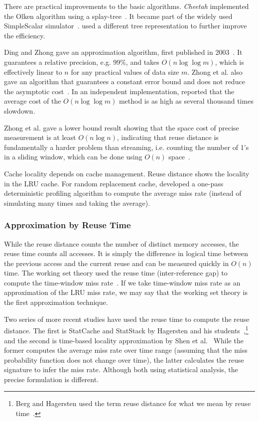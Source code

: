 There are practical improvements to the basic algorithms.  {\em Cheetah}
implemented the Olken algorithm using a
splay-tree~\citep{Sugumar:Dissertation}.  It became part of the
widely used SimpleScalar simulator~\citep{BurgerA:TR97}.
\citet{Almasi+:MSP02} used a different tree representation to further
improve the efficiency.
 
Ding and Zhong gave an approximation algorithm, first published in
2003~\citep{DingZ:PLDI03,Zhong+:TOPLAS09}.  It guarantees a relative
precision, e.g. 99\%, and takes $O( n \log \log m)$, which is
effectively linear to $n$ for any practical values of data size $m$.
Zhong et al. also gave an algorithm that guarantees a constant error
bound and does not reduce the asymptotic cost~\citep{Zhong+:LCR02}.
In an independent implementation, \citet{Schuff+:PACT10} reported that the average cost of the
$O(n \log \log m)$ method is as high as
several thousand times slowdown.

Zhong et al. gave a lower bound result showing that the space
cost of precise measurement is at least $O(n \log n)$, indicating that
reuse distance is fundamentally a harder problem than streaming, i.e. 
counting the number of 1's in a sliding window, which can be done
using $O(n)$ space~\citep{Zhong+:TOPLAS09}.  

Cache locality depends on cache management.  Reuse distance shows the
locality in the LRU cache.  For random
replacement cache, \citet{Zhou:NPC10} developed a one-pass
deterministic profiling algorithm to compute the average miss rate
(instead of simulating many times and taking the average).


\subsubsection{Approximation by Reuse Time}
While the reuse distance counts the number of distinct memory
accesses, the reuse time counts all accesses.  It is simply the difference in logical
time between the previous access and the current reuse and can be measured
quickly in $O(n)$ time.  The 
working set theory used the reuse time (inter-reference gap) to compute the time-window miss
rate~\citep{DenningS:CACM72}.  If we take time-window miss rate as an approximation of the LRU miss
rate, we may say that the working set theory is the first
approximation technique.  

Two series of more recent studies have used the reuse time
to compute the reuse distance.  The first is StatCache and StatStack
by Hagersten and his
students~\citep{BergH:ISPASS04,BergH:SIGMETRICS05,EklovH:ISPASS10,Eklov+:HiPEAC11},\footnote{Berg and
  Hagersten used the term reuse distance for what we mean by reuse
  time~\citep{BergH:ISPASS04}.}
and the second is time-based locality approximation by Shen et
al.~\citep{Shen+:POPL07,ShenS:LCPC08,Jiang+:CC10} 
While the former 
computes the average miss
rate over time range (assuming that the miss probability function does
not change over time), 
the latter calculates the reuse signature to
infer the miss rate.  Although both using statistical analysis,
the precise formulation is different.

